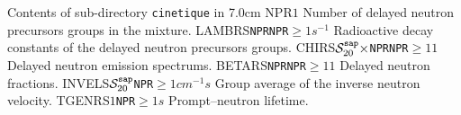 \begin{DescriptionEnregistrement}{Contents of sub-directory {\tt cinetique} in }{7.0cm}
\IntEnr
  {NPR}{$1$}
  {Number of delayed neutron precursors groups in the mixture.}
\OptRealEnr
  {LAMBRS}{\tt NPR}{{\tt NPR}$\ge 1$}{$s^{-1}$}
  {Radioactive decay constants of the delayed neutron precursors groups.}
\OptRealEnr
  {CHIRS}{$\mathcal{S}^{\tt sap}_{20}\times${\tt NPR}}{{\tt NPR}$\ge 1$}{$1$}
  {Delayed neutron emission spectrums.}
\OptRealEnr
  {BETARS}{\tt NPR}{{\tt NPR}$\ge 1$}{$1$}
  {Delayed neutron fractions.}
\OptRealEnr
  {INVELS}{$\mathcal{S}^{\tt sap}_{20}$}{{\tt NPR}$\ge 1$}{$cm^{-1}s$}
  {Group average of the inverse neutron velocity.}
\OptRealEnr
  {TGENRS}{$1$}{{\tt NPR}$\ge 1$}{$s$}
  {Prompt--neutron lifetime.}
\end{DescriptionEnregistrement}
